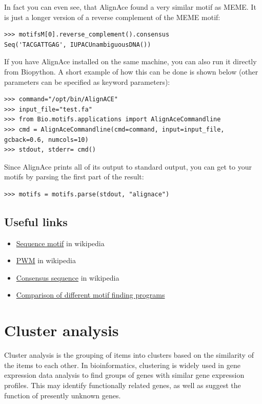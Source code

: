 \documentclass{report}
\begin{document}
In fact you can even see, that AlignAce found a very similar motif as
MEME. It is just a longer version of a reverse complement of the MEME
motif:
\begin{verbatim}
>>> motifsM[0].reverse_complement().consensus
Seq('TACGATTGAG', IUPACUnambiguousDNA())
\end{verbatim}

If you have AlignAce installed on the same machine, you can also run
it directly from Biopython. A short example of how this can be done is
shown below (other parameters can be specified as keyword parameters):

\begin{verbatim}
>>> command="/opt/bin/AlignACE"
>>> input_file="test.fa"
>>> from Bio.motifs.applications import AlignAceCommandline
>>> cmd = AlignAceCommandline(cmd=command, input=input_file, gcback=0.6, numcols=10)
>>> stdout, stderr= cmd()
\end{verbatim}

Since AlignAce prints all of its output to standard output, you can get
to your motifs by parsing the first part of the result:
\begin{verbatim}
>>> motifs = motifs.parse(stdout, "alignace")
\end{verbatim}



\section{Useful links }
\label{sec:links}


\begin{itemize}
\item \href{http://en.wikipedia.org/wiki/Sequence_motif}{Sequence motif} in wikipedia
\item \href{http://en.wikipedia.org/wiki/Position_weight_matrix}{PWM} in wikipedia
\item \href{http://en.wikipedia.org/wiki/Consensus_sequence}{Consensus sequence} in wikipedia
\item \href{http://bio.cs.washington.edu/assessment/}{Comparison of different motif finding programs} 
\end{itemize}


\chapter{Cluster analysis}

Cluster analysis is the grouping of items into clusters based on the similarity of the items to each other. In bioinformatics, clustering is widely used in gene expression data analysis to find groups of genes with similar gene expression profiles. This may identify functionally related genes, as well as suggest the function of presently unknown genes.
\end{document}
